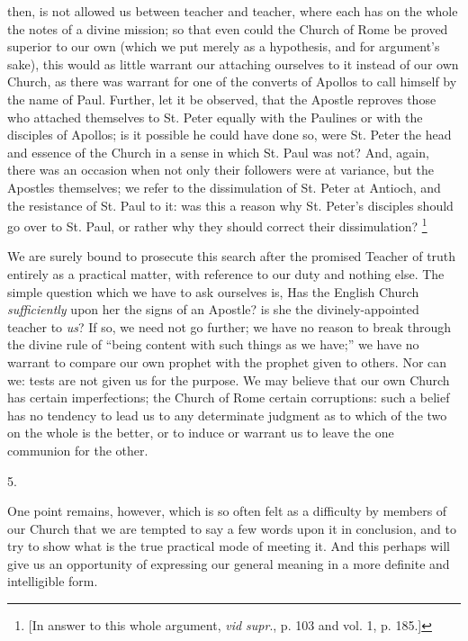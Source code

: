 then, is not allowed us between teacher and teacher, where each has on
the whole the notes of a divine mission; so that even could the Church
of Rome be proved superior to our own (which we put merely as a
hypothesis, and for argument's sake), this would as little warrant our
attaching ourselves to it instead of our own Church, as there was
warrant for one of the converts of Apollos to call himself by the name
of Paul. Further, let it be observed, that the Apostle reproves those
who attached themselves to St. Peter equally with the Paulines or with
the disciples of Apollos; is it possible he could have done so, were
St. Peter the head and essence of the Church in a sense in which St.
Paul was not? And, again, there was an occasion when not only their
followers were at variance, but the Apostles themselves; we refer to
the dissimulation of St. Peter at Antioch, and the resistance of St.
Paul to it: was this a reason why St. Peter's disciples should go over
to St. Paul, or rather why they should correct their dissimulation? \footnote{[In answer to this whole argument, \emph{vid supr}., p. 103 and
vol. 1, p. 185.]}

We are surely bound to prosecute this search after the promised
Teacher of truth entirely as a practical matter, with reference to our
duty and nothing else. The simple question which we have to ask
ourselves is, Has the English Church \emph{sufficiently} upon her the
signs of an Apostle? is she the divinely-appointed teacher to \emph{us}?
If so, we need not go further; we have no reason to break through the
divine rule of ``being content with such things as we have;''
we have no warrant to compare our own prophet with the prophet given
to others. Nor can we: tests are not given us for the purpose.
We may believe that our own Church has certain imperfections; the
Church of Rome certain corruptions: such a belief has no tendency to
lead us to any determinate judgment as to which of the two on the
whole is the better, or to induce or warrant us to leave the one
communion for the other.

5.

One point remains, however, which is so often felt as a difficulty
by members of our Church that we are tempted to say a few words upon
it in conclusion, and to try to show what is the true practical mode
of meeting it. And this perhaps will give us an opportunity of
expressing our general meaning in a more definite and intelligible
form.

